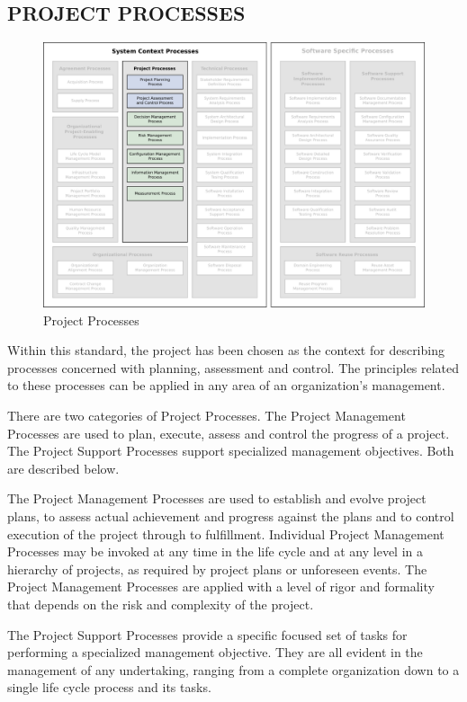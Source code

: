 	\newpage 
	\subsection{PROJECT PROCESSES\label{subsec:project_processes}}

		\begin{figure}[h]
			\centering
			\includegraphics[width=15cm,keepaspectratio]{figures/life-cycle-process-groups-project-processes.pdf}
			\caption{Project Processes}
			\label{fig:project_processes}
		\end{figure}

		\begin{adjustwidth}{1em}{0pt}

			Within this standard, the project has been chosen as the context for describing processes concerned with planning, assessment and control. The principles related to these processes can be applied in any area of an organization's management.

			There are two categories of Project Processes. The Project Management Processes are used to plan, execute, assess and control the progress of a project. The Project Support Processes support specialized management objectives. Both are described below.
			
			The Project Management Processes are used to establish and evolve project plans, to assess actual achievement and progress against the plans and to control execution of the project through to fulfillment. Individual Project Management Processes may be invoked at any time in the life cycle and at any level in a hierarchy of projects, as required by project plans or unforeseen events. The Project Management Processes are applied with a level of rigor and formality that depends on the risk and complexity of the project.

			The Project Support Processes provide a specific focused set of tasks for performing a specialized management objective. They are all evident in the management of any undertaking, ranging from a complete organization down to a single life cycle process and its tasks.

		\end{adjustwidth}
		
